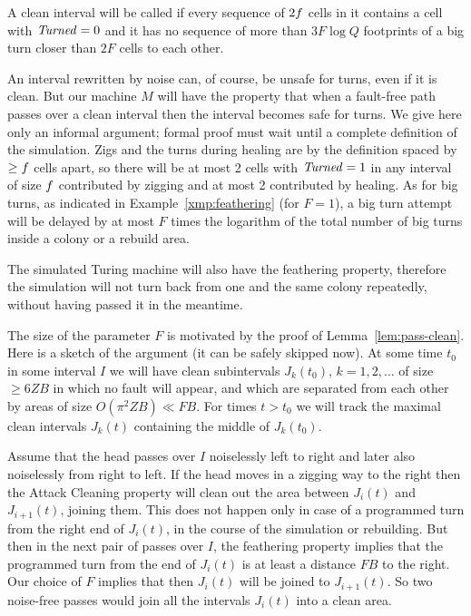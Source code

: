\documentclass[11pt]{memoir}
\theoremstyle{definition} %
\renewcommand{\ge}{\geq}
\newcommand{\fld}[1]{\ensuremath{\textit{#1\/}}}
\def\B{B}
\newcommand{\F}{F}
\newcommand{\passno}{\pi}
\newcommand{\Q}{Q} %
\newcommand{\Z}{Z} %
\newcommand{\Turned}{\fld{Turned}} %
\begin{document}
\begin{definition}\label{def:safe-for-turns}
  A clean interval will be called  if every sequence of \( 2f \) cells in it contains a cell with
  \( \Turned=0 \) and it has no sequence of more than \( 3\F\log\Q \) footprints of a big turn closer than \( 2\F \)
  cells to each other.
\end{definition}

An interval rewritten by noise can, of course, be unsafe for turns, even if it is clean.
But our machine \( M \) will have the property that when a fault-free
path passes over a clean interval then
the interval becomes safe for turns.
We give here only an informal argument; formal proof must wait until 
a complete definition of the simulation.
Zigs and the turns during healing are by the definition spaced by \( \ge\f \) cells apart, so
there will be at most 2 cells with \( \Turned=1 \) in any interval of size \( f \)
contributed by zigging and at most 2 contributed by healing.
As for big turns, as indicated in Example~\ref{xmp:feathering} (for \( \F=1 \)),
a big turn attempt will be delayed by at most \( \F \) times the logarithm
of the total number of big turns inside a colony or a rebuild area.

The simulated Turing machine will also have the feathering property,
therefore the simulation will not turn back 
from one and the same colony repeatedly, without having passed it in the meantime.

\begin{sloppypar}
\begin{remark}\label{rem:big-turns}
  The size of the parameter \( \F \) is motivated by the proof of Lemma~\ref{lem:pass-clean}.
  Here is a sketch of the argument (it can be safely skipped now).
   At some time \( t_{0} \) in some interval \( I \)
  we will have clean subintervals \( J_{k}(t_{0}) \), \( k=1,2,\dots \)
  of size \( \ge 6\Z\B \) in which no fault will appear, and which are separated from each other by areas of
  size \( O(\passno^{2}\Z\B)\ll\F\B \).
  For times \( t>t_{0} \) we will track the maximal clean intervals \( J_{k}(t) \) containing
  the middle of \( J_{k}(t_{0}) \).

  Assume that the head passes over \( I \) noiselessly left to right and later
  also noiselessly from right to left.
  If the head moves in a zigging way to the
  right then the Attack Cleaning property will clean out the area between \( J_{i}(t) \) and \( J_{i+1}(t) \),
  joining them.
  This does not happen only in case of a programmed turn
  from the right end of \( J_{i}(t) \), in the course of the simulation or rebuilding.
  But then in the next pair of passes over \( I \), the feathering property implies that
  the programmed turn from the end of \( J_{i}(t) \) is at least a distance \( \F\B \) to the right.
  Our choice of \( \F \) implies that then \( J_{i}(t) \) will be joined to \( J_{i+1}(t) \).
  So two noise-free passes would join all the intervals \( J_{i}(t) \) into a clean area.  
\end{remark}  
\end{sloppypar}
\end{document}
